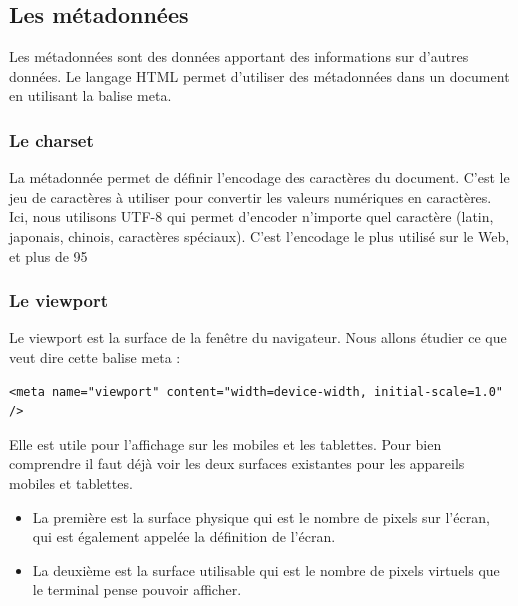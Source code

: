 \documentclass[a4paper]{article}
\begin{document}
\subsection{Les métadonnées}
Les métadonnées sont des données apportant des informations sur d'autres données. Le langage {\color{monOrange}HTML} permet d'utiliser des métadonnées dans un document en utilisant la balise {\color{monOrange}meta}.

\subsubsection{Le {\color{monOrange}charset}}
La métadonnée permet de définir l'encodage des caractères du document. C'est le jeu de caractères à utiliser pour convertir les valeurs numériques en caractères. Ici, nous utilisons {\color{monOrange}UTF-8} qui permet d'encoder n'importe quel caractère (latin, japonais, chinois, caractères spéciaux). C'est l'encodage le plus utilisé sur le {\color{monOrange}Web}, et plus de 95%

\subsubsection{Le {\color{monOrange}viewport}}
Le {\color{monOrange}viewport} est la surface de la fenêtre du navigateur. Nous allons étudier ce que veut dire cette balise {\color{monOrange}meta} :

\begin{verbatim}
<meta name="viewport" content="width=device-width, initial-scale=1.0" />
\end{verbatim}

Elle est utile pour l'affichage sur les mobiles et les tablettes. Pour bien comprendre il faut déjà voir les deux surfaces existantes pour les appareils mobiles et tablettes.
\begin{itemize}
\item La première est la surface physique qui est le nombre de pixels sur l'écran, qui est également appelée la définition de l'écran.
\item La deuxième est la surface utilisable qui est le nombre de pixels virtuels que le terminal pense pouvoir afficher.
\end{itemize}
\end{document}
